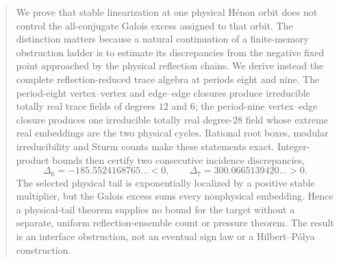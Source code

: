 \begin{abstract}
We prove that stable linearization at one physical H\'enon orbit does not
control the all-conjugate Galois excess assigned to that orbit.  The
distinction matters because a natural continuation of a finite-memory
obstruction ladder is to estimate its discrepancies from the negative fixed
point approached by the physical reflection chains.  We derive instead the
complete reflection-reduced trace algebra at periods eight and nine.  The
period-eight vertex--vertex and edge--edge closures produce irreducible
totally real trace fields of degrees $12$ and $6$; the period-nine
vertex--edge closure produces one irreducible totally real degree-$28$ field
whose extreme real embeddings are the two physical cycles.  Rational root
boxes, modular irreducibility and Sturm counts make these statements exact.
Integer-product bounds then certify two consecutive incidence discrepancies,
\[
\Delta_6=-185.5524168765\ldots<0,
\qquad
\Delta_7=300.0665139420\ldots>0.
\]
The selected physical tail is exponentially localized by a positive stable
multiplier, but the Galois excess sums every nonphysical embedding.  Hence a
physical-tail theorem supplies no bound for the target without a separate,
uniform reflection-ensemble count or pressure theorem.  The result is an
interface obstruction, not an eventual sign law or a Hilbert--P\'olya
construction.
\end{abstract}
